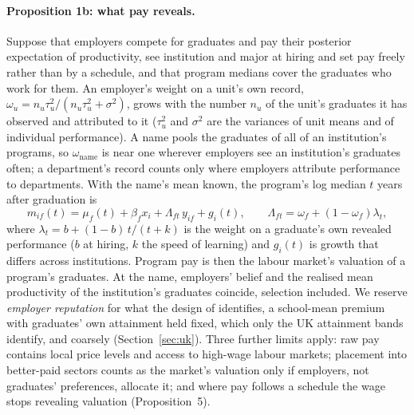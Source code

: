 \documentclass[11pt]{article}
\begin{document}
\paragraph{Proposition 1b: what pay reveals.} Suppose that employers compete for graduates and pay their
posterior expectation of productivity, see institution and major at hiring and set pay freely rather than by a
schedule, and that program medians cover the graduates who work for them. An employer's weight on a unit's own
record, $\omega_u=n_u\tau_u^2/(n_u\tau_u^2+\sigma^2)$, grows with the number $n_u$ of the unit's graduates it has
observed and attributed to it ($\tau_u^2$ and $\sigma^2$ are the variances of unit means and of individual
performance). A name pools the graduates of all of an institution's programs, so $\omega_{\text{name}}$ is near one
wherever employers see an institution's graduates often; a department's record counts only where employers
attribute performance to departments. With the name's mean known, the
program's log median $t$ years after graduation is
\begin{equation}\label{eq:theory-wage}
m_{if}(t)=\mu_f(t)+\beta_fx_i+\Lambda_{ft}\,y_{if}+g_{i}(t),\qquad \Lambda_{ft}=\omega_f+(1-\omega_f)\lambda_t ,
\end{equation}
where $\lambda_t=b+(1-b)\,t/(t+k)$ is the weight on a graduate's own revealed performance ($b$ at hiring, $k$ the
speed of learning) and $g_i(t)$ is growth that differs across institutions. Program pay is then the labour
market's valuation of a program's graduates. At the name, employers' belief and the realised mean productivity of the institution's graduates coincide,
selection included. We reserve \emph{employer reputation} for what the
design of \citet{macleod2017big} identifies, a school-mean premium with graduates' own attainment held fixed,
which only the UK attainment bands identify, and coarsely (Section~\ref{sec:uk}). Three further limits apply: raw
pay contains local price levels and access to high-wage labour markets; placement into better-paid sectors counts
as the market's valuation only if employers, not graduates' preferences, allocate it; and where pay follows a
schedule the wage stops revealing valuation (Proposition~5).
\end{document}
